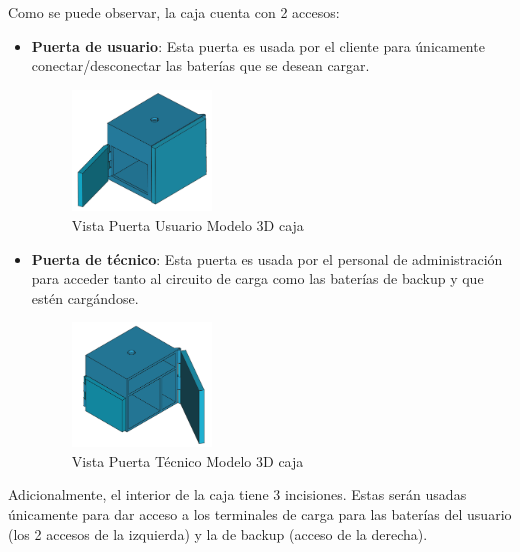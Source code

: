 Como se puede observar, la caja cuenta con 2 accesos:
\begin{itemize}
    \item \textbf{Puerta de usuario}: Esta puerta es usada por el cliente para únicamente conectar/desconectar las baterías que se desean cargar.

\begin{figure}[H]
    \centering
    \includegraphics[width=0.35\textwidth]{images/4-DesarrolloTeorico/4-1-caja/CAJA_3D_PUERTA_USER.png}
    \caption{Vista Puerta Usuario Modelo 3D caja}
    \label{fig:DesarrolloTeorico/Caja/CAJA_3D_PUERTA_USER}
\end{figure}

    \item \textbf{Puerta de técnico}: Esta puerta es usada por el personal de administración para acceder tanto al circuito de carga como las baterías de backup y que estén cargándose.
\begin{figure}[H]
    \centering
    \includegraphics[width=0.35\textwidth]{images/4-DesarrolloTeorico/4-1-caja/CAJA_3D_PUERTA_ADMIN.png}
    \caption{Vista Puerta Técnico Modelo 3D caja}
    \label{fig:DesarrolloTeorico/Caja/CAJA_3D_PUERTA_ADMIN}
\end{figure}

\end{itemize}

Adicionalmente, el interior de la caja tiene 3 incisiones. Estas serán usadas únicamente para dar acceso a los terminales de carga para las baterías del usuario (los 2 accesos de la izquierda) y la de backup (acceso de la derecha).

